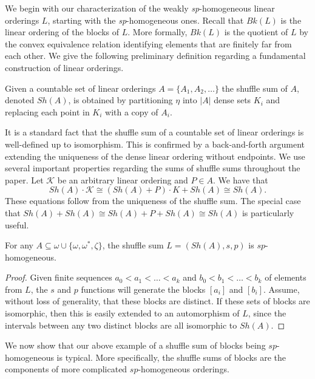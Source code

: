 \documentclass[11pt]{amsart}
\theoremstyle{definition}
\def\K{\mathcal K}
\begin{document}
  


We begin with our characterization of the weakly \textit{sp}-homogeneous linear orderings $L$, starting with the \textit{sp}-homogeneous ones. Recall that $Bk(L)$ is the linear ordering of the blocks of $L$.
More formally, $Bk(L)$ is the quotient of $L$ by the convex equivalence relation identifying elements that are finitely far from each other.
We give the following preliminary definition regarding a fundamental construction of linear orderings.


\begin{definition}
    Given a countable set of linear orderings $A=\{A_1,A_2,\dots\}$ the shuffle sum of $A$, denoted $Sh(A)$, is obtained by partitioning $\eta$ into $|A|$ dense
sets $K_i$ and replacing each point in $K_i$ with a copy of $A_i$.
\end{definition}


It is a standard fact that the shuffle sum of a countable set of linear orderings is well-defined up to isomorphism.
This is confirmed by a back-and-forth argument extending the uniqueness of the dense linear ordering without endpoints.
We use several important properties regarding the sums of shuffle sums throughout the paper.
Let $\K$ be an arbitrary linear ordering and $P\in A$.
We have that
\[Sh(A)\cdot\K\cong(Sh(A)+P)\cdot K +Sh(A)\cong Sh(A).\]
These equations follow from the uniqueness of the shuffle sum.
The special case that $Sh(A)+Sh(A)\cong Sh(A)+P+Sh(A)\cong Sh(A)$ is particularly useful.


\begin{theorem} \label{ush} For any $A \subseteq \omega\cup\{\omega,\omega^*,\zeta\}$, the shuffle sum $L = (Sh(A),s,p)$ is $sp$-homogeneous. 
\end{theorem}

\begin{proof} Given finite sequences $a_0 < a_1 < \dots < a_k$ and $b_0 < b_1 < \dots < b_k$ of elements from $L$, the $s$ and $p$ functions will generate the blocks $[a_i]$ and $[b_i]$. Assume, without loss of generality, that these blocks are distinct. If these sets of blocks are isomorphic, then this is easily extended to an automorphism of $L$, since the intervals between any two distinct blocks are all isomorphic to $Sh(A)$. 
\end{proof}

 



We now show that our above example of a shuffle sum of blocks being $sp$-homogeneous is typical.
More specifically, the shuffle sums of blocks are the components of more complicated $sp$-homogeneous orderings.
\end{document}

